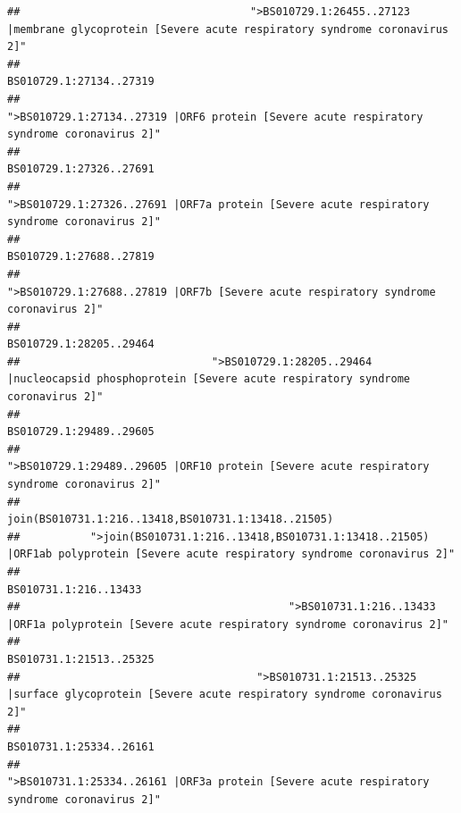 \documentclass[
]{article}
\begin{document}
\begin{verbatim}
##                                    ">BS010729.1:26455..27123 |membrane glycoprotein [Severe acute respiratory syndrome coronavirus 2]" 
##                                                                                                                BS010729.1:27134..27319 
##                                             ">BS010729.1:27134..27319 |ORF6 protein [Severe acute respiratory syndrome coronavirus 2]" 
##                                                                                                                BS010729.1:27326..27691 
##                                            ">BS010729.1:27326..27691 |ORF7a protein [Severe acute respiratory syndrome coronavirus 2]" 
##                                                                                                                BS010729.1:27688..27819 
##                                                    ">BS010729.1:27688..27819 |ORF7b [Severe acute respiratory syndrome coronavirus 2]" 
##                                                                                                                BS010729.1:28205..29464 
##                              ">BS010729.1:28205..29464 |nucleocapsid phosphoprotein [Severe acute respiratory syndrome coronavirus 2]" 
##                                                                                                                BS010729.1:29489..29605 
##                                            ">BS010729.1:29489..29605 |ORF10 protein [Severe acute respiratory syndrome coronavirus 2]" 
##                                                                                    join(BS010731.1:216..13418,BS010731.1:13418..21505) 
##           ">join(BS010731.1:216..13418,BS010731.1:13418..21505) |ORF1ab polyprotein [Severe acute respiratory syndrome coronavirus 2]" 
##                                                                                                                  BS010731.1:216..13433 
##                                          ">BS010731.1:216..13433 |ORF1a polyprotein [Severe acute respiratory syndrome coronavirus 2]" 
##                                                                                                                BS010731.1:21513..25325 
##                                     ">BS010731.1:21513..25325 |surface glycoprotein [Severe acute respiratory syndrome coronavirus 2]" 
##                                                                                                                BS010731.1:25334..26161 
##                                            ">BS010731.1:25334..26161 |ORF3a protein [Severe acute respiratory syndrome coronavirus 2]" 

\end{verbatim}
\end{document}
